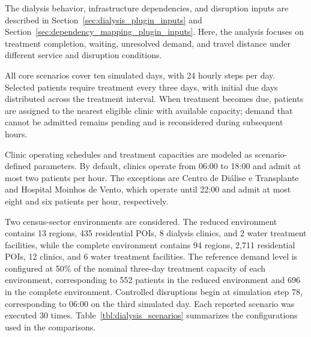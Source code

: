 The dialysis behavior, infrastructure dependencies, and disruption inputs are described in Section~\ref{sec:dialysis_plugin_inputs} and Section~\ref{sec:dependency_mapping_plugin_inputs}.
Here, the analysis focuses on treatment completion, waiting, unresolved demand, and travel distance under different service and disruption conditions.

All core scenarios cover ten simulated days, with 24 hourly steps per day. Selected patients require treatment every three days, with initial due days distributed across the treatment interval. When treatment becomes due, patients are assigned to the nearest eligible clinic with available capacity; demand that cannot be admitted remains pending and is reconsidered during subsequent hours.

Clinic operating schedules and treatment capacities are modeled as scenario-defined parameters. By default, clinics operate from 06:00 to 18:00 and admit at most two patients per hour. The exceptions are Centro de Diálise e Transplante and Hospital Moinhos de Vento, which operate until 22:00 and admit at most eight and six patients per hour, respectively.

Two census-sector environments are considered. The reduced environment contains 13 regions, 435 residential POIs, 8 dialysis clinics, and 2 water treatment facilities, while the complete environment contains 94 regions, 2,711 residential POIs, 12 clinics, and 6 water treatment facilities. The reference demand level is configured at 50\% of the nominal three-day treatment capacity of each environment, corresponding to 552 patients in the reduced environment and 696 in the complete environment. Controlled disruptions begin at simulation step 78, corresponding to 06:00 on the third simulated day.
Each reported scenario was executed 30 times. Table~\ref{tbl:dialysis_scenarios} summarizes the configurations used in the comparisons. 

